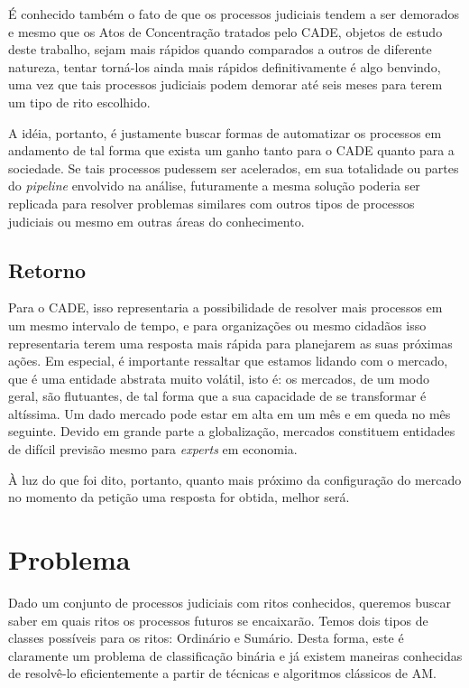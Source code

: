 \documentclass[11pt]{report}
\begin{document}
É conhecido também o fato de que os processos judiciais tendem a ser demorados e mesmo que os Atos de Concentração tratados pelo CADE, objetos de estudo deste
trabalho, sejam mais rápidos quando comparados a outros de diferente natureza, tentar torná-los ainda mais rápidos definitivamente é algo benvindo, uma vez que
tais processos judiciais podem demorar até seis meses para terem um tipo de rito escolhido.

A idéia, portanto, é justamente buscar formas de automatizar os processos em andamento de tal forma que exista um ganho tanto para o CADE quanto para a sociedade.
Se tais processos pudessem ser acelerados, em sua totalidade ou partes do \textit{pipeline} envolvido na análise, futuramente a mesma solução poderia ser replicada
para resolver problemas similares com outros tipos de processos judiciais ou mesmo em outras áreas do conhecimento.

\subsection{Retorno}

\indent\indent Para o CADE, isso representaria a possibilidade de resolver mais processos em um mesmo intervalo de tempo, e para organizações ou mesmo cidadãos isso representaria
terem uma resposta mais rápida para planejarem as suas próximas ações. Em especial, é importante ressaltar que estamos lidando com o mercado, que é uma
entidade abstrata muito volátil, isto é: os mercados, de um modo geral, são flutuantes, de tal forma que a sua capacidade de se transformar é altíssima.
Um dado mercado pode estar em alta em um mês e em queda no mês seguinte. Devido em grande parte a globalização, mercados constituem entidades de difícil previsão
mesmo para \textit{experts} em economia.

À luz do que foi dito, portanto, quanto mais próximo da configuração do mercado no momento da petição uma resposta for obtida, melhor será.

\section{Problema}

\indent\indent Dado um conjunto de processos judiciais com ritos conhecidos, queremos buscar saber em quais ritos os processos futuros se encaixarão. Temos dois tipos de classes possíveis para os ritos:
Ordinário e Sumário. Desta forma, este é claramente um problema de classificação binária e já existem maneiras conhecidas de resolvê-lo eficientemente a partir
de técnicas e algoritmos clássicos de AM.
\end{document}
